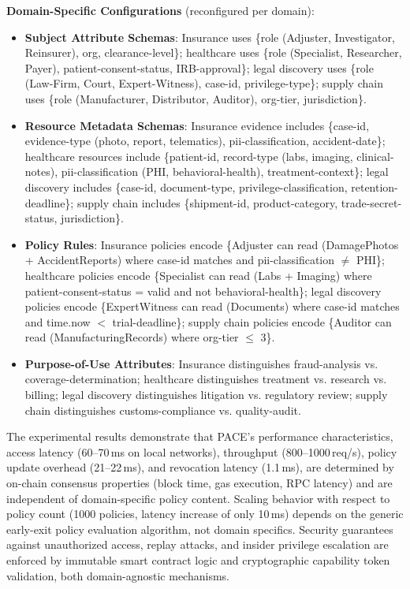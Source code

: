 \documentclass[pdflatex,sn-mathphys-num]{sn-jnl}
\begin{document}
\textbf{Domain-Specific Configurations} (reconfigured per domain):
\begin{itemize}
	\item \textbf{Subject Attribute Schemas}: Insurance uses \{role (Adjuster, Investigator, Reinsurer), org, clearance-level\}; healthcare uses \{role (Specialist, Researcher, Payer), patient-consent-status, IRB-approval\}; legal discovery uses \{role (Law-Firm, Court, Expert-Witness), case-id, privilege-type\}; supply chain uses \{role (Manufacturer, Distributor, Auditor), org-tier, jurisdiction\}.
	
	\item \textbf{Resource Metadata Schemas}: Insurance evidence includes \{case-id, evidence-type (photo, report, telematics), pii-classification, accident-date\}; healthcare resources include \{patient-id, record-type (labs, imaging, clinical-notes), pii-classification (PHI, behavioral-health), treatment-context\}; legal discovery includes \{case-id, document-type, privilege-classification, retention-deadline\}; supply chain includes \{shipment-id, product-category, trade-secret-status, jurisdiction\}.
	
	\item \textbf{Policy Rules}: Insurance policies encode \{Adjuster can read (DamagePhotos + AccidentReports) where case-id matches and pii-classification $\neq$ PHI\}; healthcare policies encode \{Specialist can read (Labs + Imaging) where patient-consent-status = valid and not behavioral-health\}; legal discovery policies encode \{ExpertWitness can read (Documents) where case-id matches and time.now $<$ trial-deadline\}; supply chain policies encode \{Auditor can read (ManufacturingRecords) where org-tier $\leq$ 3\}.
	
	\item \textbf{Purpose-of-Use Attributes}: Insurance distinguishes fraud-analysis vs. coverage-determination; healthcare distinguishes treatment vs. research vs. billing; legal discovery distinguishes litigation vs. regulatory review; supply chain distinguishes customs-compliance vs. quality-audit.
\end{itemize}

The experimental results demonstrate that PACE's performance characteristics, access latency (60--70\,ms on local networks), throughput (800--1000\,req/s), policy update overhead (21--22\,ms), and revocation latency (1.1\,ms), are determined by on-chain consensus properties (block time, gas execution, RPC latency) and are independent of domain-specific policy content. Scaling behavior with respect to policy count (1000 policies, latency increase of only 10\,ms) depends on the generic early-exit policy evaluation algorithm, not domain specifics. Security guarantees against unauthorized access, replay attacks, and insider privilege escalation are enforced by immutable smart contract logic and cryptographic capability token validation, both domain-agnostic mechanisms.
\end{document}

